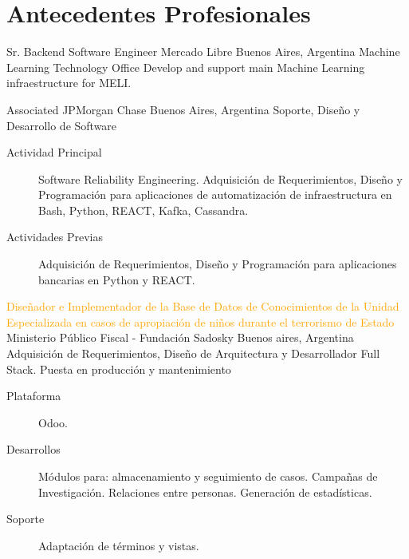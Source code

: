 \section{Antecedentes Profesionales}

	{Sr. Backend Software Engineer}
	{Mercado Libre}
	{Buenos Aires, Argentina}
	{Machine Learning Technology Office}
	{Develop and support main Machine Learning infraestructure for MELI.}


	{Associated}
	{JPMorgan Chase}
	{Buenos Aires, Argentina}
	{Soporte, Diseño y Desarrollo de Software}
	{\begin{description}
	\item [Actividad Principal] Software Reliability Engineering. Adquisición de Requerimientos, Diseño y Programación para aplicaciones de automatización de infraestructura en Bash, Python, REACT, Kafka, Cassandra.
	\item [Actividades Previas] Adquisición de Requerimientos, Diseño y Programación para aplicaciones bancarias en Python y REACT.
	\end{description}}

	{\textcolor{orange}{Diseñador e Implementador de la Base de Datos de Conocimientos de la Unidad Especializada en casos de apropiación de niños durante el terrorismo de Estado}}
	{Ministerio Público Fiscal - Fundación Sadosky}
	{Buenos aires, Argentina}
	{Adquisición de Requerimientos, Diseño de Arquitectura y Desarrollador Full Stack. Puesta en producción y mantenimiento} 
	{\begin{description}
	\item [Plataforma] Odoo.
	\item [Desarrollos] Módulos para: almacenamiento y seguimiento de casos. Campañas de Investigación. Relaciones entre personas. Generación de estadísticas.
	\item [Soporte] Adaptación de términos y vistas.
	\end{description}}

